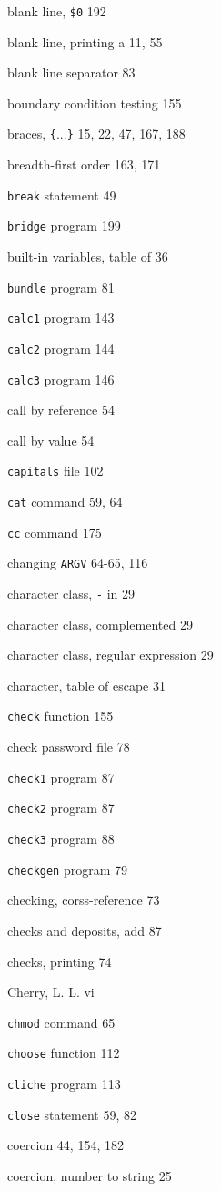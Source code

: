 \begin{multicols}{2}
blank line, \verb'$0' 192 

blank line, printing a 11, 55

blank line separator 83

boundary condition testing 155

braces, \verb'{'...\verb'}' 15, 22, 47, 167, 188

breadth-first order 163, 171

\verb'break' statement 49

\verb'bridge' program 199

built-in variables, table of 36

\verb'bundle' program 81

\verb'calc1' program 143

\verb'calc2' program 144

\verb'calc3' program 146

call by reference 54

call by value 54

\verb'capitals' file 102

\verb'cat' command 59, 64

\verb'cc' command 175

changing \verb'ARGV' 64-65, 116

character class, \verb'-' in 29

character class, complemented 29

character class, regular expression 29

character, table of escape 31

\verb'check' function 155

check password file 78

\verb'check1' program 87

\verb'check2' program 87

\verb'check3' program 88

\verb'checkgen' program 79

checking, corss-reference 73

checks and deposits, add 87

checks, printing 74

Cherry, L. L. vi 

\verb'chmod' command 65

\verb'choose' function 112

\verb'cliche' program 113

\verb'close' statement 59, 82

coercion 44, 154, 182

coercion, number to string 25


\end{multicols}
